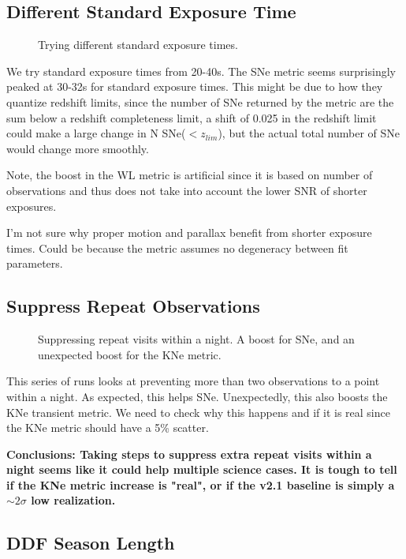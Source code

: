 \subsection{Different Standard Exposure Time}


\begin{figure}
\caption{Trying different standard exposure times.  }
\end{figure}


We try standard exposure times from 20-40s.  The SNe metric seems surprisingly peaked at 30-32s for standard exposure times. This might be due to how they quantize redshift limits, since the number of SNe returned by the metric are the sum below a redshift completeness limit, a shift of 0.025 in the redshift limit could make a large change in N SNe($<z_{lim}$), but the actual total number of SNe would change more smoothly. 

Note, the boost in the WL metric is artificial since it is based on number of observations and thus does not take into account the lower SNR of shorter exposures. 


I'm not sure why proper motion and parallax benefit from shorter exposure times. Could be because the metric assumes no degeneracy between fit parameters. 

\subsection{Suppress Repeat Observations}


\begin{figure}
\caption{Suppressing repeat visits within a night. A boost for SNe, and an unexpected boost for the KNe metric. }
\end{figure}


This series of runs looks at preventing more than two observations to a point within a night. As expected, this helps SNe. Unexpectedly, this also boosts the KNe transient metric. We need to check why this happens and if it is real since the KNe metric should have a 5\% scatter.


{\bf Conclusions:  Taking steps to suppress extra repeat visits within a night seems like it could help multiple science cases. It is tough to tell if the KNe metric increase is "real", or if the v2.1 baseline is simply a $\sim 2\sigma$ low realization.}


\subsection{DDF Season Length}

